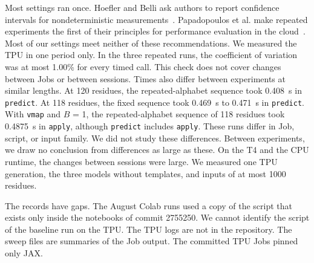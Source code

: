 Most settings ran once. Hoefler and Belli ask authors to report confidence intervals for nondeterministic
measurements~\cite{hoefler2015benchmarking}. Papadopoulos et al. make repeated experiments the first of their principles
for performance evaluation in the cloud~\cite{papadopoulos2021principles}. Most of our settings meet neither of these
recommendations. We measured the TPU in one period only.
In the three repeated runs, the coefficient of variation was at most 1.00\% for every timed call. %
This check does not cover changes between Jobs or between sessions. Times also differ between experiments at similar
lengths.
At 120 residues, the repeated-alphabet sequence took 0.408~s in \texttt{predict}. %
At 118 residues, the fixed sequence took 0.469~s to 0.471~s in \texttt{predict}. %
With \texttt{vmap} and $B$ = 1, the repeated-alphabet sequence of 118 residues took 0.4875~s in \texttt{apply}, although \texttt{predict} includes \texttt{apply}. %
These runs differ in Job, script, or input family. We did not study these differences. Between experiments, we draw no
conclusion from differences as large as these. On the T4 and the CPU runtime, the changes between sessions were large.
We measured one TPU generation, the three models without templates, and inputs of at most 1000 residues. %

The records have gaps.
The August Colab runs used a copy of the script that exists only inside the notebooks of commit 2755250. %
We cannot identify the script of the baseline run on the TPU. The TPU logs are not in the repository. The sweep files are
summaries of the Job output. The committed TPU Jobs pinned only JAX.
